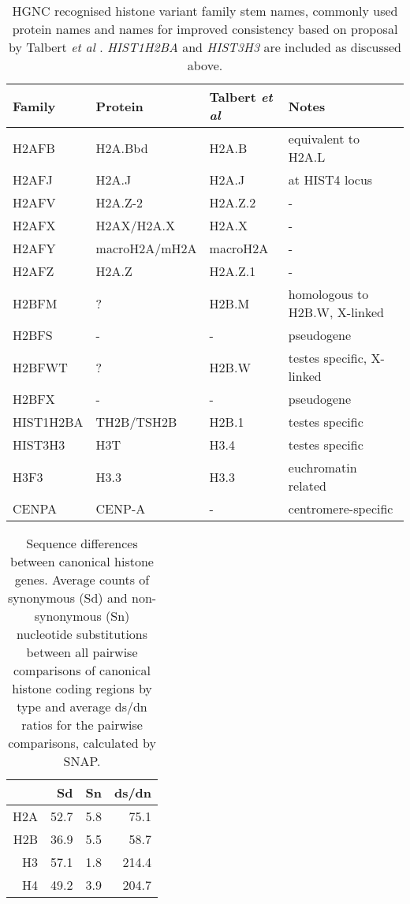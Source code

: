 \newpage
\begin{table*}
	\caption{HGNC recognised histone variant family stem names, commonly used protein names 
	and names for improved consistency based on proposal by Talbert \textit{et al} \citep{Talbert2012}. 
	\textit{HIST1H2BA} and \textit{HIST3H3} are included as discussed above.}
	\label{tab:histone-variant-families}
	\centering
	\begin{tabular}{l l l l}
	\toprule
	Family & Protein & Talbert \textit{et al} & Notes \\
	\midrule
	H2AFB & H2A.Bbd & H2A.B & equivalent to H2A.L \\
	H2AFJ & H2A.J & H2A.J & at HIST4 locus \\
	H2AFV & H2A.Z-2 & H2A.Z.2 & - \\
	H2AFX & H2AX/H2A.X & H2A.X & - \\
	H2AFY & macroH2A/mH2A & macroH2A & - \\
	H2AFZ & H2A.Z & H2A.Z.1 & - \\
	H2BFM & ? & H2B.M & homologous to H2B.W, X-linked\\
	H2BFS & - & - & pseudogene \\
	H2BFWT & ? & H2B.W & testes specific, X-linked \\
	H2BFX & - & - & pseudogene \\
	HIST1H2BA & TH2B/TSH2B & H2B.1 & testes specific \\
	HIST3H3 & H3T & H3.4 & testes specific \\
	H3F3 & H3.3 & H3.3 & euchromatin related \\
	CENPA & CENP-A & - & centromere-specific \\
	\bottomrule
	\end{tabular}
\end{table*}

\newpage
\begin{table*}
	\caption{
	Sequence differences between canonical histone genes.
	Average counts of synonymous (Sd) and non-synonymous (Sn) nucleotide substitutions 
	between all pairwise comparisons of canonical histone coding regions by type 
	and average ds/dn ratios for the pairwise comparisons, 
	calculated by SNAP.}
	\label{tab:histone-gene-differences}
	\centering
	\begin{tabular}{r r r r}
		\toprule
		\null & Sd & Sn & ds/dn \\
		\midrule
		H2A	& 52.7 & 5.8 & 75.1 \\
		H2B	& 36.9 & 5.5 & 58.7 \\
		H3	& 57.1 & 1.8 & 214.4 \\
		H4	& 49.2 & 3.9 & 204.7 \\
		\bottomrule
	\end{tabular}
\end{table*}

